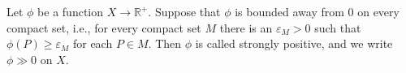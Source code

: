Let $\phi$ be a function $X \rightarrow \mathbb{R}^+$. Suppose that $\phi$ is bounded away from 0 on every compact set, i.e., for every compact set $M$ there is an $\varepsilon_M > 0$ such that $\phi(P) \geqslant \varepsilon_M$ for each $P \in M$. Then $\phi$ is called strongly positive, and we write $\phi \gg 0$ on $X$.
